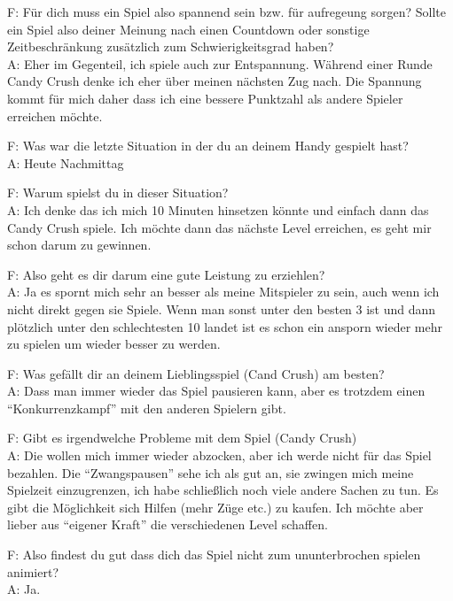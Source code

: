 \documentclass[12pt, a4paper]{article}
\begin{document}
\begin{flushleft}
F: Für dich muss ein Spiel also spannend sein bzw. für aufregeung sorgen? Sollte ein Spiel also deiner Meinung nach einen Countdown oder sonstige Zeitbeschränkung zusätzlich zum Schwierigkeitsgrad haben?\\
A: Eher im Gegenteil, ich spiele auch zur Entspannung. Während einer Runde Candy Crush denke ich eher über meinen nächsten Zug nach. Die Spannung kommt für mich daher dass ich eine bessere Punktzahl als andere Spieler erreichen möchte.\newline

F: Was war die letzte Situation in der du an deinem Handy gespielt hast?\\
A: Heute Nachmittag\newline

F: Warum spielst du in dieser Situation?\\
A: Ich denke das ich mich 10 Minuten hinsetzen könnte und einfach dann das Candy Crush spiele. Ich möchte dann das nächste Level erreichen, es geht mir schon darum zu gewinnen.\newline

F: Also geht es dir darum eine gute Leistung zu erziehlen?\\
A: Ja es spornt mich sehr an besser als meine Mitspieler zu sein, auch wenn ich nicht direkt gegen sie Spiele. Wenn man sonst unter den besten 3 ist und dann plötzlich unter den schlechtesten 10 landet ist es schon ein ansporn wieder mehr zu spielen um wieder besser zu werden.\newline

F: Was gefällt dir an deinem Lieblingsspiel (Cand Crush) am besten?\\
A: Dass man immer wieder das Spiel pausieren kann, aber es trotzdem einen “Konkurrenzkampf” mit den anderen Spielern gibt.\newline

F: Gibt es irgendwelche Probleme mit dem Spiel (Candy Crush)\\
A: Die wollen mich immer wieder abzocken, aber ich werde nicht für das Spiel bezahlen. Die “Zwangspausen” sehe ich als gut an, sie zwingen mich meine Spielzeit einzugrenzen, ich habe schließlich noch viele andere Sachen zu tun. Es gibt die Möglichkeit sich Hilfen (mehr Züge etc.) zu kaufen. Ich möchte aber lieber aus “eigener Kraft” die verschiedenen Level schaffen.\newline

F: Also findest du gut dass dich das Spiel nicht zum ununterbrochen spielen animiert?\\
A: Ja.\newline


\end{flushleft}
\end{document}
